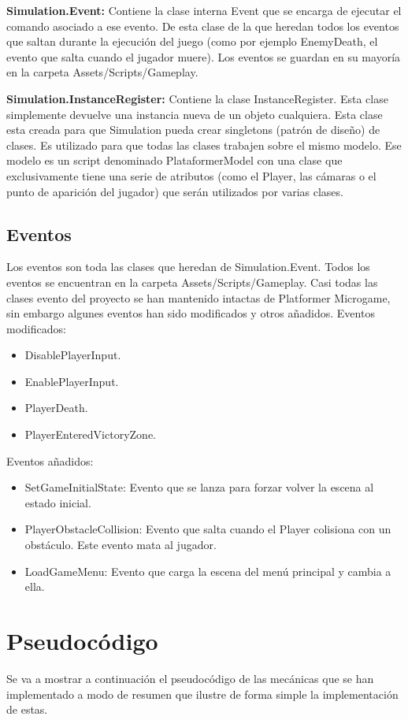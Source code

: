 \textbf{Simulation.Event:} Contiene la clase interna Event que se encarga de ejecutar el comando asociado a ese evento. De esta clase de la que heredan todos los eventos que saltan durante la ejecución del juego (como por ejemplo EnemyDeath, el evento que salta cuando el jugador muere). Los eventos se guardan en su mayoría en la carpeta Assets/Scripts/Gameplay.

\textbf{Simulation.InstanceRegister:} Contiene la clase InstanceRegister. Esta clase simplemente devuelve una instancia nueva de un objeto cualquiera. Esta clase esta creada para que Simulation pueda crear singletons (patrón de diseño) de clases. Es utilizado para que todas las clases trabajen sobre el mismo modelo. Ese modelo es un script denominado PlataformerModel con una clase que exclusivamente tiene una serie de atributos (como el Player, las cámaras o el punto de aparición del jugador) que serán utilizados por varias clases.

\subsection{Eventos}
Los eventos son toda las clases que heredan de Simulation.Event. Todos los eventos se encuentran en la carpeta Assets/Scripts/Gameplay. Casi todas las clases evento del proyecto se han mantenido intactas de Platformer Microgame, sin embargo algunes eventos han sido modificados y otros añadidos.
Eventos modificados:
\begin{itemize}
\item
DisablePlayerInput.
\item
EnablePlayerInput.
\item
PlayerDeath.
\item
PlayerEnteredVictoryZone.
\end{itemize}
Eventos añadidos:
\begin{itemize}
\item
SetGameInitialState: Evento que se lanza para forzar volver la escena al estado inicial.
\item
PlayerObstacleCollision: Evento que salta cuando el Player colisiona con un obstáculo. Este evento mata al jugador.
\item
LoadGameMenu: Evento que carga la escena del menú principal y cambia a ella.
\end{itemize}

\section{Pseudocódigo}
Se va a mostrar a continuación el pseudocódigo de las mecánicas que se han implementado a modo de resumen que ilustre de forma simple la implementación de estas.


